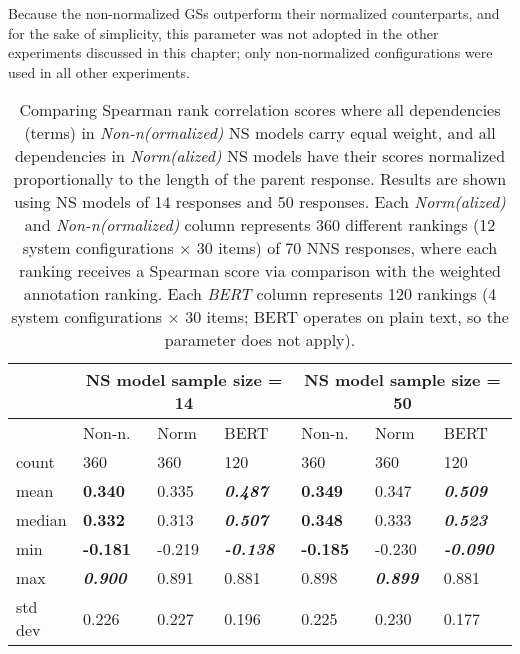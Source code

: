 Because the non-normalized GSs outperform their normalized counterparts, and for the sake of simplicity, this parameter was not adopted in the other experiments discussed in this chapter; only non-normalized configurations were used in all other experiments.
\begin{table}[htb!]
\begin{center}
\begin{tabular}{|l||l|l|l||l|l|l|}
\hline
 & \multicolumn{3}{c||}{NS model sample size = 14} & \multicolumn{3}{c|}{NS model sample size = 50} \\
\hline
		& Non-n. 		& Norm 			& BERT 								& Non-n. 			& Norm 				& BERT 		\\
\hline
\hline
count 	& 360 			& 360 			& 120 								& 360 				& 360 				& 120		 \\
\hline
mean 	& \textbf{0.340} & 0.335 & \textit{\textbf{0.487}}					& \textbf{0.349} 	& 0.347 		& \textit{\textbf{0.509}}		 \\
\hline
median 	& \textbf{0.332} & 0.313 & \textit{\textbf{0.507}} 					& \textbf{0.348} 	& 0.333 		& \textit{\textbf{0.523}}		 \\
\hline
min 	& \textbf{-0.181} 	& -0.219 & \textit{\textbf{-0.138}} 			& \textbf{-0.185} 	& -0.230 		& \textit{\textbf{-0.090}}		 \\
\hline
max	& \textit{\textbf{0.900}} & 0.891 	& 0.881 							& 0.898 	& \textit{\textbf{0.899}} 	& 0.881		 \\
\hline
std dev & 0.226 		& 0.227 		& 0.196 							& 0.225 		& 0.230 				& 0.177		 \\
\hline
\end{tabular}
\caption{\label{tab:term-norm-results} Comparing Spearman rank correlation scores where all dependencies (terms) in \textit{Non-n(ormalized)} NS models carry equal weight, and all dependencies in \textit{Norm(alized)} NS models have their scores normalized proportionally to the length of the parent response. Results are shown using NS models of 14 responses and 50 responses. Each \textit{Norm(alized)} and \textit{Non-n(ormalized)} column represents 360 different rankings (12 system configurations $\times$ 30 items) of 70 NNS responses, where each ranking receives a Spearman score via comparison with the weighted annotation ranking. Each \textit{BERT} column represents 120 rankings (4 system configurations $\times$ 30 items; BERT operates on plain text, so the  parameter does not apply).
}
\end{center}
\end{table}


